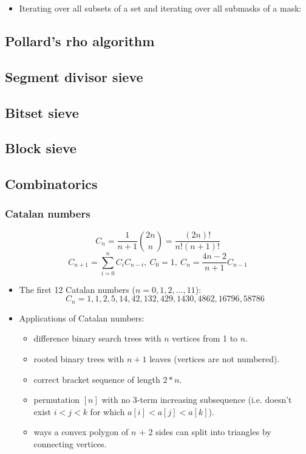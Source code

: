 \begin{itemize}
	\item Iterating over all subsets of a set and iterating over all submasks of a mask:
\end{itemize}

\subsection{Pollard's rho algorithm}

\subsection{Segment divisor sieve}

\subsection{Bitset sieve}

\subsection{Block sieve}

\subsection{Combinatorics}
\subsubsection{Catalan numbers}
\[ C_n = \frac{1}{n + 1} {2n \choose n} = \frac{(2n)!}{n!(n+1)!}\]
\[ C_{n + 1} = \displaystyle\sum_{i = 0}^{n}C_i C_{n - i},\ C_0 = 1,\ C_n = \frac{4n - 2}{n + 1}C_{n - 1}\]
\begin{itemize}
	\item The first 12 Catalan numbers ($n = 0, 1, 2, \ldots, 11$): 
	\[ C_n = 1, 1, 2, 5, 14, 42, 132, 429, 1430, 4862, 16796, 58786 \]
	\item Applications of Catalan numbers:
	\begin{itemize}
		\item difference binary search trees with $n$ vertices from 1 to $n$. 
		\item rooted binary trees with $n + 1$ leaves (vertices are not numbered).
		\item correct bracket sequence of length $2 * n$.
		\item permutation $[n]$ with no 3-term increasing subsequence (i.e. doesn't exist $i < j < k$ for which $a[i] < a[j] < a[k]$).
		\item ways a convex polygon of $n$ + 2 sides can split into triangles by connecting vertices. 
	\end{itemize}
\end{itemize}

